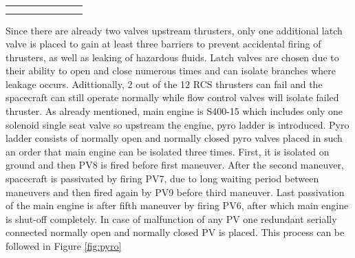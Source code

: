 \begin{table}[h]
{\begin{tabular}{|l|l|r|r|r|r|r|l|}
\multicolumn{1}{l}{}                                           & \multicolumn{1}{l}{}                                     & \multicolumn{1}{r}{}                                     & \multicolumn{1}{r}{}                                                                              & \multicolumn{1}{r}{}                 & \multicolumn{1}{r}{}                                                                           & \multicolumn{1}{r}{}     & \multicolumn{1}{l}{}                                                                                                                                                                                                         \\
\multicolumn{1}{l}{}                                           & \multicolumn{1}{l}{}                                     & \multicolumn{1}{r}{}                                     & \multicolumn{1}{r}{}                                                                              & \multicolumn{1}{r}{}                 & \multicolumn{1}{r}{}                                                                           & \multicolumn{1}{r}{}     & \multicolumn{1}{l}{}                                                                                                                                                                                                        
\end{tabular}}
\end{table}





Since there are already two valves upstream thrusters, only one additional latch valve is placed to gain at least three barriers to prevent accidental
firing of thrusters, as well as leaking of hazardous fluids. Latch valves are chosen due to their ability to open and close numerous times and can isolate branches where leakage occurs. Adittionally, 2 out of the 12 RCS thrusters can fail and the spacecraft can still operate normally while flow control valves will isolate failed thruster.
As already mentioned, main engine is S400-15 which includes only one solenoid single seat valve so upstream the engine, pyro ladder is introduced. Pyro ladder consists of normally open and normally closed pyro valves placed in such an order that main engine can be isolated three times. First, it is isolated on ground and then PV8 is fired before first maneuver. After the second maneuver, spacecraft is passivated by firing PV7, due to long waiting period between maneuvers and then fired again by PV9 before third maneuver. Last passivation of the main engine is after fifth maneuver by firing PV6, after which main engine is shut-off completely. In case of malfunction of any PV one redundant serially connected normally open and normally closed PV is placed. This process can be followed in Figure \ref{fig:pyro}

